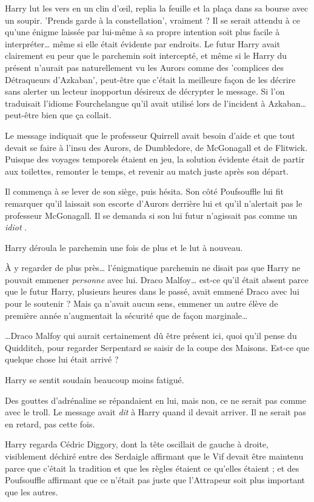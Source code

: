 Harry lut les vers en un clin d'œil, replia la feuille et la plaça dans sa bourse avec un soupir. 'Prends garde à la constellation', vraiment ? Il se serait attendu à ce qu'une énigme laissée par lui-même à sa propre intention soit plus facile à interpréter… même si elle était évidente par endroits. Le futur Harry avait clairement eu peur que le parchemin soit intercepté, et même si le Harry du présent n'aurait pas naturellement vu les Aurors comme des 'complices des Détraqueurs d'Azkaban', peut-être que c'était la meilleure façon de les décrire sans alerter un lecteur inopportun désireux de décrypter le message. Si l'on traduisait l'idiome Fourchelangue qu'il avait utilisé lors de l'incident à Azkaban… peut-être bien que ça collait.

Le message indiquait que le professeur Quirrell avait besoin d'aide et que tout devait se faire à l'insu des Aurors, de Dumbledore, de McGonagall et de Flitwick. Puisque des voyages temporels étaient en jeu, la solution évidente était de partir aux toilettes, remonter le temps, et revenir au match juste après son départ.

Il commença à se lever de son siège, puis hésita. Son côté Poufsouffle lui fit remarquer qu'il laissait son escorte d'Aurors derrière lui et qu'il n'alertait pas le professeur McGonagall. Il se demanda si son lui futur n'agissait pas comme un \emph{idiot} .

Harry déroula le parchemin une fois de plus et le lut à nouveau.

À y regarder de plus près… l'énigmatique parchemin ne disait pas que Harry ne pouvait emmener \emph{personne}  avec lui. Draco Malfoy… est-ce qu'il était absent parce que le futur Harry, plusieurs heures dans le passé, avait emmené Draco avec lui pour le soutenir ? Mais ça n'avait aucun sens, emmener un autre élève de première année n'augmentait la sécurité que de façon marginale…

…Draco Malfoy qui aurait certainement dû être présent ici, quoi qu'il pense du Quidditch, pour regarder Serpentard se saisir de la coupe des Maisons. Est-ce que quelque chose lui était arrivé ?

Harry se sentit soudain beaucoup moins fatigué.

Des gouttes d'adrénaline se répandaient en lui, mais non, ce ne serait pas comme avec le troll. Le message avait \emph{dit}  à Harry quand il devait arriver. Il ne serait pas en retard, pas cette fois.

Harry regarda Cédric Diggory, dont la tête oscillait de gauche à droite, visiblement déchiré entre des Serdaigle affirmant que le Vif devait être maintenu parce que c'était la tradition et que les règles étaient ce qu'elles étaient ; et des Poufsouffle affirmant que ce n'était pas juste que l'Attrapeur soit plus important que les autres.

